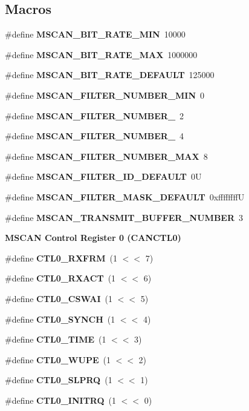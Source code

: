 \subsection*{Macros}
\begin{DoxyCompactItemize}
\item 
\#define {\bfseries M\+S\+C\+A\+N\+\_\+\+B\+I\+T\+\_\+\+R\+A\+T\+E\+\_\+\+M\+IN}~10000
\item 
\#define {\bfseries M\+S\+C\+A\+N\+\_\+\+B\+I\+T\+\_\+\+R\+A\+T\+E\+\_\+\+M\+AX}~1000000
\item 
\#define {\bfseries M\+S\+C\+A\+N\+\_\+\+B\+I\+T\+\_\+\+R\+A\+T\+E\+\_\+\+D\+E\+F\+A\+U\+LT}~125000
\item 
\#define {\bfseries M\+S\+C\+A\+N\+\_\+\+F\+I\+L\+T\+E\+R\+\_\+\+N\+U\+M\+B\+E\+R\+\_\+\+M\+IN}~0
\item 
\#define {\bfseries M\+S\+C\+A\+N\+\_\+\+F\+I\+L\+T\+E\+R\+\_\+\+N\+U\+M\+B\+E\+R\+\_}~2
\item 
\#define {\bfseries M\+S\+C\+A\+N\+\_\+\+F\+I\+L\+T\+E\+R\+\_\+\+N\+U\+M\+B\+E\+R\+\_}~4
\item 
\#define {\bfseries M\+S\+C\+A\+N\+\_\+\+F\+I\+L\+T\+E\+R\+\_\+\+N\+U\+M\+B\+E\+R\+\_\+\+M\+AX}~8
\item 
\#define {\bfseries M\+S\+C\+A\+N\+\_\+\+F\+I\+L\+T\+E\+R\+\_\+\+I\+D\+\_\+\+D\+E\+F\+A\+U\+LT}~0U
\item 
\#define {\bfseries M\+S\+C\+A\+N\+\_\+\+F\+I\+L\+T\+E\+R\+\_\+\+M\+A\+S\+K\+\_\+\+D\+E\+F\+A\+U\+LT}~0xffffffffU
\item 
\#define {\bfseries M\+S\+C\+A\+N\+\_\+\+T\+R\+A\+N\+S\+M\+I\+T\+\_\+\+B\+U\+F\+F\+E\+R\+\_\+\+N\+U\+M\+B\+ER}~3
\end{DoxyCompactItemize}
\begin{Indent}\textbf{ M\+S\+C\+AN Control Register 0 (C\+A\+N\+C\+T\+L0)}\par
\begin{DoxyCompactItemize}
\item 
\#define {\bfseries C\+T\+L0\+\_\+\+R\+X\+F\+RM}~(1 $<$$<$ 7)
\item 
\#define {\bfseries C\+T\+L0\+\_\+\+R\+X\+A\+CT}~(1 $<$$<$ 6)
\item 
\#define {\bfseries C\+T\+L0\+\_\+\+C\+S\+W\+AI}~(1 $<$$<$ 5)
\item 
\#define {\bfseries C\+T\+L0\+\_\+\+S\+Y\+N\+CH}~(1 $<$$<$ 4)
\item 
\#define {\bfseries C\+T\+L0\+\_\+\+T\+I\+ME}~(1 $<$$<$ 3)
\item 
\#define {\bfseries C\+T\+L0\+\_\+\+W\+U\+PE}~(1 $<$$<$ 2)
\item 
\#define {\bfseries C\+T\+L0\+\_\+\+S\+L\+P\+RQ}~(1 $<$$<$ 1)
\item 
\#define {\bfseries C\+T\+L0\+\_\+\+I\+N\+I\+T\+RQ}~(1 $<$$<$ 0)
\end{DoxyCompactItemize}
\end{Indent}
